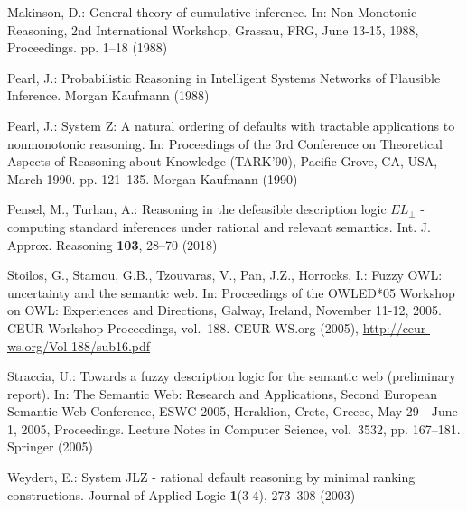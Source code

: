 \documentclass[runningheads]{llncs}
\begin{document}
\begin{thebibliography}{10}
Makinson, D.: General theory of cumulative inference. In: Non-Monotonic
  Reasoning, 2nd International Workshop, Grassau, FRG, June 13-15, 1988,
  Proceedings. pp. 1--18 (1988)

Pearl, J.: Probabilistic Reasoning in Intelligent Systems Networks of Plausible
  Inference. Morgan Kaufmann (1988)

Pearl, J.: System {Z:} {A} natural ordering of defaults with tractable
  applications to nonmonotonic reasoning. In: Proceedings of the 3rd Conference
  on Theoretical Aspects of Reasoning about Knowledge (TARK'90), Pacific Grove,
  CA, USA, March 1990. pp. 121--135. Morgan Kaufmann (1990)

Pensel, M., Turhan, A.: Reasoning in the defeasible description logic ${
  EL}_\bot$ - computing standard inferences under rational and relevant
  semantics. Int. J. Approx. Reasoning  \textbf{103},  28--70 (2018)

Stoilos, G., Stamou, G.B., Tzouvaras, V., Pan, J.Z., Horrocks, I.: Fuzzy {OWL:}
  uncertainty and the semantic web. In: Proceedings of the OWLED*05 Workshop on
  {OWL:} Experiences and Directions, Galway, Ireland, November 11-12, 2005.
  {CEUR} Workshop Proceedings, vol.~188. CEUR-WS.org (2005),
  \url{http://ceur-ws.org/Vol-188/sub16.pdf}

Straccia, U.: Towards a fuzzy description logic for the semantic web
  (preliminary report). In: The Semantic Web: Research and Applications, Second
  European Semantic Web Conference, {ESWC} 2005, Heraklion, Crete, Greece, May
  29 - June 1, 2005, Proceedings. Lecture Notes in Computer Science, vol.~3532,
  pp. 167--181. Springer (2005)

Weydert, E.: System {JLZ} - rational default reasoning by minimal ranking
  constructions. Journal of Applied Logic  \textbf{1}(3-4),  273--308 (2003)

\end{thebibliography}



%
\end{document}
